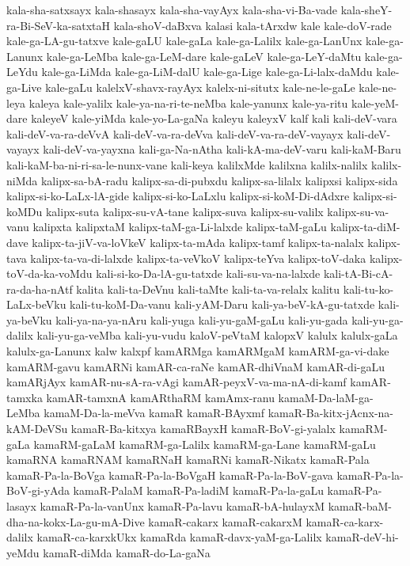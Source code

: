 {kala-sha-satxsayx
kala-shasayx
kala-sha-vayAyx
kala-sha-vi-Ba-vade
kala-sheY-ra-Bi-SeV-ka-satxtaH
kala-shoV-daBxva
kalasi
kala-tArxdw
kale
kale-doV-rade
kale-ga-LA-gu-tatxve
kale-gaLU
kale-gaLa
kale-ga-Lalilx
kale-ga-LanUnx
kale-ga-Lanunx
kale-ga-LeMba
kale-ga-LeM-dare
kale-gaLeV
kale-ga-LeY-daMtu
kale-ga-LeYdu
kale-ga-LiMda
kale-ga-LiM-dalU
kale-ga-Lige
kale-ga-Li-lalx-daMdu
kale-ga-Live
kale-gaLu
kalelxV-shavx-rayAyx
kalelx-ni-situtx
kale-ne-le-gaLe
kale-ne-leya
kaleya
kale-yalilx
kale-ya-na-ri-te-neMba
kale-yanunx
kale-ya-ritu
kale-yeM-dare
kaleyeV
kale-yiMda
kale-yo-La-gaNa
kaleyu
kaleyxV
kalf
kali
kali-deV-vara
kali-deV-va-ra-deVvA
kali-deV-va-ra-deVva
kali-deV-va-ra-deV-vayayx
kali-deV-vayayx
kali-deV-va-yayxna
kali-ga-Na-nAtha
kali-kA-ma-deV-varu
kali-kaM-Baru
kali-kaM-ba-ni-ri-sa-le-nunx-vane
kali-keya
kalilxMde
kalilxna
kalilx-nalilx
kalilx-niMda
kalipx-sa-bA-radu
kalipx-sa-di-pubxdu
kalipx-sa-lilalx
kalipxsi
kalipx-sida
kalipx-si-ko-LaLx-lA-gide
kalipx-si-ko-LaLxlu
kalipx-si-koM-Di-dAdxre
kalipx-si-koMDu
kalipx-suta
kalipx-su-vA-tane
kalipx-suva
kalipx-su-valilx
kalipx-su-va-vanu
kalipxta
kalipxtaM
kalipx-taM-ga-Li-lalxde
kalipx-taM-gaLu
kalipx-ta-diM-dave
kalipx-ta-jiV-va-loVkeV
kalipx-ta-mAda
kalipx-tamf
kalipx-ta-nalalx
kalipx-tava
kalipx-ta-va-di-lalxde
kalipx-ta-veVkoV
kalipx-teYva
kalipx-toV-daka
kalipx-toV-da-ka-voMdu
kali-si-ko-Da-lA-gu-tatxde
kali-su-va-na-lalxde
kali-tA-Bi-cA-ra-da-ha-nAtf
kalita
kali-ta-DeVnu
kali-taMte
kali-ta-va-relalx
kalitu
kali-tu-ko-LaLx-beVku
kali-tu-koM-Da-vanu
kali-yAM-Daru
kali-ya-beV-kA-gu-tatxde
kali-ya-beVku
kali-ya-na-ya-nAru
kali-yuga
kali-yu-gaM-gaLu
kali-yu-gada
kali-yu-ga-dalilx
kali-yu-ga-veMba
kali-yu-vudu
kaloV-peVtaM
kalopxV
kalulx
kalulx-gaLa
kalulx-ga-Lanunx
kalw
kalxpf
kamARMga
kamARMgaM
kamARM-ga-vi-dake
kamARM-gavu
kamARNi
kamAR-ca-raNe
kamAR-dhiVnaM
kamAR-di-gaLu
kamARjAyx
kamAR-nu-sA-ra-vAgi
kamAR-peyxV-va-ma-nA-di-kamf
kamAR-tamxka
kamAR-tamxnA
kamARthaRM
kamAmx-ranu
kamaM-Da-laM-ga-LeMba
kamaM-Da-la-meVva
kamaR
kamaR-BAyxmf
kamaR-Ba-kitx-jAcnx-na-kAM-DeVSu
kamaR-Ba-kitxya
kamaRBayxH
kamaR-BoV-gi-yalalx
kamaRM-gaLa
kamaRM-gaLaM
kamaRM-ga-Lalilx
kamaRM-ga-Lane
kamaRM-gaLu
kamaRNA
kamaRNAM
kamaRNaH
kamaRNi
kamaR-Nikatx
kamaR-Pala
kamaR-Pa-la-BoVga
kamaR-Pa-la-BoVgaH
kamaR-Pa-la-BoV-gava
kamaR-Pa-la-BoV-gi-yAda
kamaR-PalaM
kamaR-Pa-ladiM
kamaR-Pa-la-gaLu
kamaR-Pa-lasayx
kamaR-Pa-la-vanUnx
kamaR-Pa-lavu
kamaR-bA-hulayxM
kamaR-baM-dha-na-kokx-La-gu-mA-Dive
kamaR-cakarx
kamaR-cakarxM
kamaR-ca-karx-dalilx
kamaR-ca-karxkUkx
kamaRda
kamaR-davx-yaM-ga-Lalilx
kamaR-deV-hi-yeMdu
kamaR-diMda
kamaR-do-La-gaNa
}
